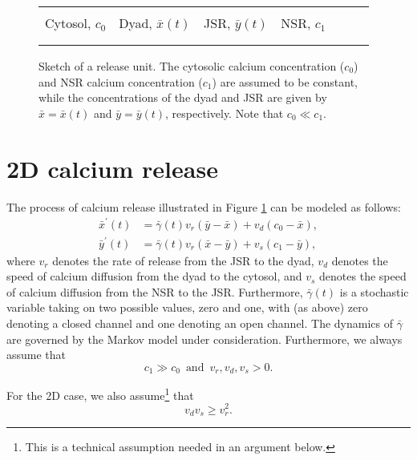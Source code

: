 \begin{figure}
[ptb]
\begin{center}
\begin{tabular}{c!{\vrule width 1pt}c!{\vrule width 1pt}c!{\vrule width 1pt}c} 
&&& \\
Cytosol, $c_0$ & Dyad, $\bar{x}(t)$ & JSR, $\bar{y}(t)$ & NSR, $c_1$ \ \ \ \ \  \\
&&& \\ 
\end{tabular}
\caption{Sketch of a release unit. The cytosolic calcium concentration ($c_0$) and NSR calcium concentration ($c_1$) are assumed to be constant, while the concentrations
of the dyad and JSR are given by $\bar{x}=\bar{x}(t)$ and $\bar{y}=\bar{y}(t)$, respectively. Note that $c_0\ll c_1$.}
\label{geom2D}
\end{center}
\end{figure}

\section{2D calcium release}

The process of calcium release illustrated in Figure \ref{geom2D} can be
modeled as follows:
\begin{align}
\bar{x}^{\prime}(t)  &  =\bar{\gamma}(t)v_{r}\left(  \bar{y}-\bar{x}\right)
+v_{d}\left(  c_{0}-\bar{x}\right)  ,\label{c1}\\
\bar{y}^{\prime}(t)  &  =\bar{\gamma}(t)v_{r}\left(  \bar{x}-\bar{y}\right)
+v_{s}\left(  c_{1}-\bar{y}\right)  , \label{c2}
\end{align}
where $v_{r}$ denotes the rate of release from the JSR to the dyad, $v_{d}$ denotes the
speed of calcium diffusion from the dyad to the cytosol, and $v_{s}$ denotes
the speed of calcium diffusion from the NSR to the JSR. Furthermore, $\bar{\gamma}(t)$
is a stochastic variable taking on two possible values, zero and one, with (as
above) zero denoting a closed channel and one denoting an open channel. The
dynamics of $\bar{\gamma}$ are governed by the Markov model under
consideration. Furthermore, we always assume that
\begin{equation}
 c_{1}\gg c_{0} \, \mbox{ and } \, v_r,v_d,v_s >0.  \label{assumption1}
\end{equation}

For the 2D case, we also assume\footnote{This is a technical assumption needed in an argument below. } that
\begin{equation}
v_{d}v_{s}\ge v_{r}^{2}.  \label{assumption2}
\end{equation}


